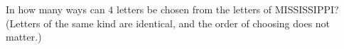 In how many ways can $4$ letters be chosen from the letters of MISSISSIPPI? (Letters of the same kind are identical, and the order of choosing does not matter.)
